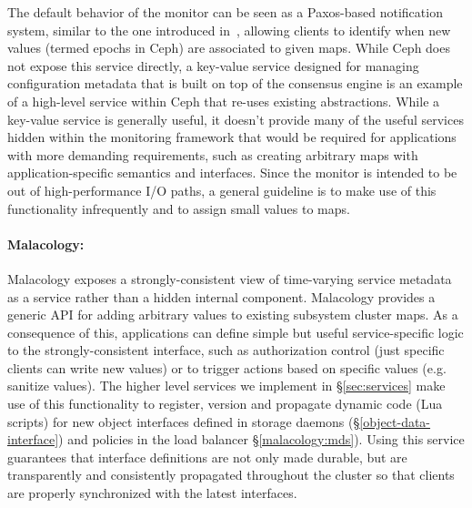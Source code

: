 \documentclass[preprint]{sigplanconf-eurosys}
\begin{document}
The default behavior of the monitor can be seen as a Paxos-based notification
system, similar to the one introduced in~\cite{burrows_chubby_2006}, allowing
clients to identify when new values (termed epochs in Ceph) are associated to
given maps.  While Ceph does not expose this service directly, a key-value
service designed for managing configuration metadata that is built on top of
the consensus engine is an example of a high-level service within Ceph that
re-uses existing abstractions.  While a key-value service is generally useful,
it doesn't provide many of the useful services hidden within the monitoring
framework that would be required for applications with more demanding
requirements, such as creating arbitrary maps with application-specific
semantics and interfaces. Since the monitor is intended to be out of
high-performance I/O paths, a general guideline is to make use of this
functionality infrequently and to assign small values to maps. 

\paragraph*{Malacology:} Malacology exposes a strongly-consistent view of
time-varying service metadata as a service rather than a hidden internal
component. Malacology provides a generic API for adding arbitrary values to
existing subsystem cluster maps. As a consequence of this, applications can
define simple but useful service-specific logic to the strongly-consistent
interface, such as authorization control (just specific clients can write new
values) or to trigger actions based on specific values (e.g. sanitize values).
The higher level services we implement in \S\ref{sec:services} make use of this
functionality to register, version and propagate dynamic code (Lua scripts) for
new object interfaces defined in storage daemons (\S\ref{object-data-interface}) and
policies in the load balancer \S\ref{malacology:mds}).  Using this service
guarantees that interface definitions are not only made durable, but are
transparently and consistently propagated throughout the cluster so that
clients are properly synchronized with the latest interfaces.

\end{document}
